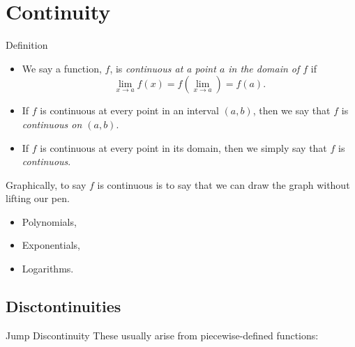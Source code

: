 \documentclass[Lecture.tex]{subfiles}
\begin{document}
\section{Continuity}

\begin{frame}{Definition}
  \begin{defn}
    \begin{itemize}[<+->]
      \item
        We say a function, $f$, is {\it continuous at a point $a$ in the domain of $f$} if 
        $$\lim_{x \rightarrow a} f(x) = f(\lim_{x \rightarrow a}) = f(a).$$
      \item
        If $f$ is continuous at every point in an interval $(a,b)$, then we say that $f$ is {\it continuous on $(a,b)$}.
      \item
        If $f$ is continuous at every point in its domain, then we simply say that $f$ is {\it continuous}.
    \end{itemize}
  \end{defn}
\end{frame}

\begin{frame}
  Graphically, to say $f$ is continuous is to say that we can draw the graph without lifting our pen.
  \begin{itemize}
  \item<3->
    Polynomials,
  \item<4->
    Exponentials,
  \item<5->
    Logarithms.
  \end{itemize}
\end{frame}

\subsection{Disctontinuities}
\begin{frame}{Jump Discontinuity}
  These usually arise from piecewise-defined functions:
  \begin{multicols}{2}
    \columnbreak
  \end{multicols}
\end{frame}
\end{document}

